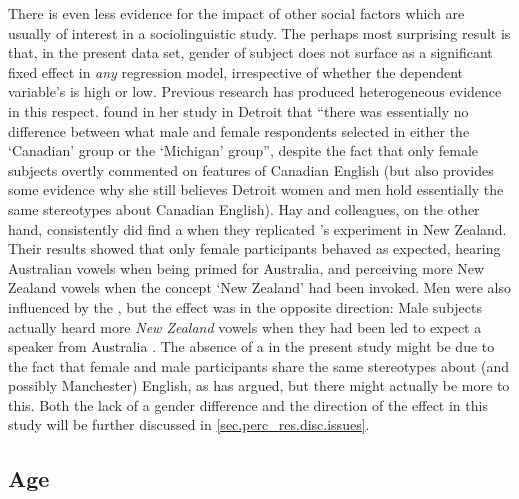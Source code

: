 There is even less evidence for the impact of other social factors which are usually of interest in a sociolinguistic study.
The perhaps most surprising result is that, in the present data set, gender of subject does not surface as a significant fixed effect in \emph{any} regression model, irrespective of whether the dependent variable's  is high or low.
Previous research has produced heterogeneous evidence in this respect.
\textcite[69 and 79--80]{niedzielski1999} found in her study in Detroit that ``there was essentially no difference between what male and female respondents selected in either the `Canadian' group or the `Michigan' group'', despite the fact that only female subjects overtly commented on  features of Canadian English (but \citeauthor{niedzielski1999} also provides some evidence why she still believes Detroit women and men hold essentially the same stereotypes about Canadian English).
Hay and colleagues, on the other hand, consistently did find a  when they replicated \citeauthor{niedzielski1999}'s experiment in New Zealand.
Their results showed that only female participants behaved as expected, hearing Australian vowels when being primed for Australia, and perceiving more New Zealand vowels when the concept `New Zealand' had been invoked.
Men were also influenced by the , but the  effect was in the opposite direction: Male subjects actually heard more \emph{New Zealand} vowels when they had been led to expect a speaker from Australia \parencite{hayetal2006a,haydrager2010}.
The absence of a  in the present study might be due to the fact that female and male participants share the same stereotypes about  (and possibly Manchester) English, as \citeauthor{niedzielski1999} has argued, but there might actually be more to this.
Both the lack of a gender difference and the direction of the  effect in this study will be further discussed in \ref{sec.perc_res.disc.issues}.

		\subsection{Age}

